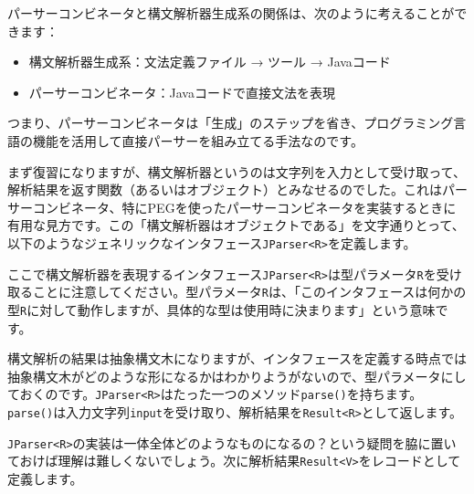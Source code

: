 パーサーコンビネータと構文解析器生成系の関係は、次のように考えることができます：

\begin{itemize}
\tightlist
\item
  構文解析器生成系：文法定義ファイル → ツール → Javaコード
\item
  パーサーコンビネータ：Javaコードで直接文法を表現
\end{itemize}

つまり、パーサーコンビネータは「生成」のステップを省き、プログラミング言語の機能を活用して直接パーサーを組み立てる手法なのです。

まず復習になりますが、構文解析器というのは文字列を入力として受け取って、解析結果を返す関数（あるいはオブジェクト）とみなせるのでした。これはパーサーコンビネータ、特にPEGを使ったパーサーコンビネータを実装するときに有用な見方です。この「構文解析器はオブジェクトである」を文字通りとって、以下のようなジェネリックなインタフェース\texttt{JParser\textless{}R\textgreater{}}を定義します。

\begin{Shaded}
\begin{Highlighting}[]
  \NormalTok{(}
\NormalTok{\}}
\end{Highlighting}
\end{Shaded}

ここで構文解析器を表現するインタフェース\texttt{JParser\textless{}R\textgreater{}}は型パラメータ\texttt{R}を受け取ることに注意してください。型パラメータ\texttt{R}は、「このインタフェースは何かの型\texttt{R}に対して動作しますが、具体的な型は使用時に決まります」という意味です。

構文解析の結果は抽象構文木になりますが、インタフェースを定義する時点では抽象構文木がどのような形になるかはわかりようがないので、型パラメータにしておくのです。\texttt{JParser\textless{}R\textgreater{}}はたった一つのメソッド\texttt{parse()}を持ちます。\texttt{parse()}は入力文字列\texttt{input}を受け取り、解析結果を\texttt{Result\textless{}R\textgreater{}}として返します。

\texttt{JParser\textless{}R\textgreater{}}の実装は一体全体どのようなものになるの？という疑問を脇に置いておけば理解は難しくないでしょう。次に解析結果\texttt{Result\textless{}V\textgreater{}}をレコードとして定義します。

\begin{Shaded}
\begin{Highlighting}[]
\end{Highlighting}
\end{Shaded}

